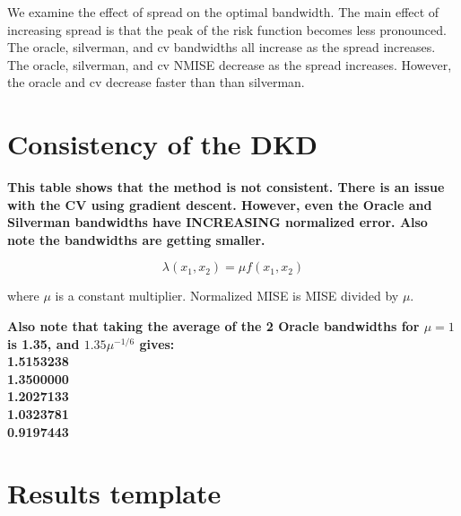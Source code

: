 We examine the effect of spread on the optimal bandwidth.
The main effect of increasing spread is that the peak of the risk function becomes less pronounced.
The \gls{oracle}, \gls{silverman}, and \gls{cv} bandwidths all increase as the spread increases.
The \gls{oracle}, \gls{silverman}, and \gls{cv} NMISE decrease as the spread increases.
However, the \gls{oracle} and \gls{cv} decrease faster than than \gls{silverman}.



\section{Consistency of the DKD}
\label{sec:results:consistency}

\textbf{
\color{red}
This table shows that the method is not consistent.
There is an issue with the CV using gradient descent.
However, even the Oracle and Silverman bandwidths have INCREASING normalized error.
Also note the bandwidths are getting smaller.
}

$$
\lambda(x_1, x_2) = \mu f\!(x_1, x_2)
$$

where $\mu$ is a constant multiplier.
Normalized MISE is MISE divided by $\mu$.

\textbf{
    \color{red}
    Also note that taking the average of the 2 Oracle bandwidths for $\mu=1$ is 1.35,
    and $1.35 \mu^{-1/6}$ gives:
    \\
    1.5153238 \\
    1.3500000 \\
    1.2027133 \\
    1.0323781 \\
    0.9197443
}


\section*{Results template}
\label{sec:results:template}
\graphicspath{{./results/unif_100_1.0_1h/}}
\makeatletter
{}
\makeatother

